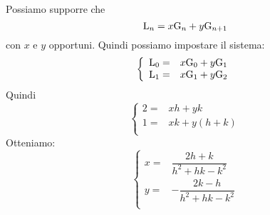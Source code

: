 Possiamo supporre che \begin{equation*}
	\mathrm{L}_{n}=x\mathrm{G}_{n}+y\mathrm{G}_{n+1}
\end{equation*}
con $x$ e $y$ opportuni. Quindi possiamo impostare il sistema:
\begin{equation*}
	\left\{
	\begin{array}{ll}
		\mathrm{L}_{0}=&x\mathrm{G}_{0}+y\mathrm{G}_{1}\\
		\mathrm{L}_{1}=&x\mathrm{G}_{1}+y\mathrm{G}_{2}\\
	\end{array}
	\right.
\end{equation*}
Quindi
\begin{equation*}
	\left\{
	\begin{array}{ll}
		2=&xh+yk\\
		1=&xk+y(h+k)\\
	\end{array}
	\right.
\end{equation*}
Otteniamo:
\begin{equation*}
	\left\{
	\begin{array}{ll}
		x=&\dfrac{2h+k}{h^2+hk-k^2}\\
		y=&-\dfrac{2k-h}{h^2+hk-k^2}\\
	\end{array}
	\right.
\end{equation*}

